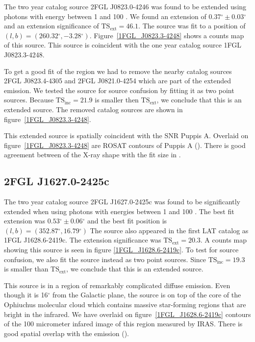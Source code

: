 \documentclass[12pt,preprint]{aastex}
\newcommand{\gev}{\text{GeV}\xspace}
\newcommand{\tsext}{{\ensuremath{\text{TS}_\text{ext}}}\xspace}
\newcommand{\tsinc}{\ensuremath{\text{TS}_\text{inc}}\xspace}
\renewcommand{\deg}{\ensuremath{^\circ}\xspace}
\begin{document}
The two year catalog source 2FGL J0823.0-4246 was found to be
extended using photons with energy between 1 \gev and 100 \gev.
We found an extension of $0.37\deg\pm0.03\deg$ and an extension
significance of $\tsext=46.1$.  The source was fit to a position of
$(l,b)=(260.32\deg,-3.28\deg)$.  Figure~\ref{1FGL_J0823.3-4248} shows a
counts map of this source.  This source is coincident with the one year
catalog source 1FGL J0823.3-4248.

To get a good fit of the region we had to remove the nearby catalog
sources 2FGL J0823.4-4305 and 2FGL J0821.0-4254 which are part of the
extended emission.  We tested the source for source confusion by fitting
it as two point sources. Because $\tsinc=21.9$ is smaller then \tsext,
we conclude that this is an extended source.  The removed catalog sources
are shown in figure~\ref{1FGL_J0823.3-4248}.

This extended source is spatially coincident with the SNR Puppis A.
Overlaid on figure~\ref{1FGL_J0823.3-4248} are ROSAT contours of Puppis
A (\cite{rosat_puppis_a}). There is good agreement between of the X-ray
shape with the fit size in \gev.


\subsection{2FGL J1627.0-2425c}
\label{section_2FGL_J1627.0-2425c}


The two year catalog source 2FGL J1627.0-2425c was found to be
significantly extended when using photons with energies between 1 \gev
and 100 \gev.  The best fit extension was $0.53\deg\pm0.06\deg$ and the
best fit position is $(l,b)=(352.87\deg, 16.79\deg)$ The source also
appeared in the first LAT catalog as 1FGL J1628.6-2419c.  The extension
significance was $\tsext=20.3$.  A counts map showing this source is
seen in figure \ref{1FGL_J1628.6-2419c}.  To test for source confusion,
we also fit the source instead as two point sources. Since $\tsinc=19.3$
is smaller than \tsext, we conclude that this is an extended source.

This source is in a region of remarkably complicated diffuse emission.
Even though it is 16\deg from the Galactic plane, the source is on top
of the core of the Ophiuchus molecular cloud which contains massive
star-forming regions that are bright in the infrared.  We have overlaid
on figure~\ref{1FGL_J1628.6-2419c} contours of the 100 micrometer infared
image of this region measured by IRAS. There is good spatial overlap
with the \gev emission (\cite{iras_rho_ophiuci}).
\end{document}
